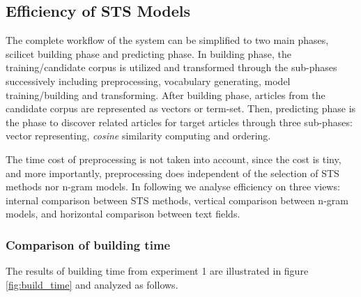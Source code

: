 \subsection{Efficiency of STS Models}
\label{sec:5.3}

The complete workflow of the system can be simplified to two main phases, scilicet building phase and predicting phase. In building phase, the training/candidate corpus is utilized and transformed through the sub-phases successively including preprocessing, vocabulary generating, model training/building and transforming. After building phase, articles from the candidate corpus are represented as vectors or term-set. Then, predicting phase is the phase to discover related articles for target articles through three sub-phases: vector representing, \textit{cosine} similarity computing and ordering. 

The time cost of preprocessing is not taken into account, since the cost is tiny, and more importantly, preprocessing does independent of the selection of STS methods nor n-gram models. In following we analyse efficiency on three views: internal comparison between STS methods, vertical comparison between n-gram models, and horizontal comparison between text fields. 

\subsubsection{Comparison of building time}



The results of building time from experiment 1 are illustrated in figure \ref{fig:build_time} and analyzed as follows. 

